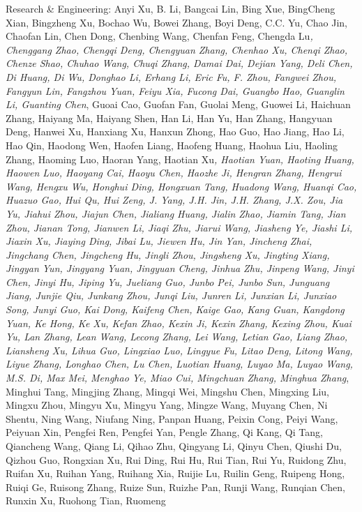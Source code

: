 \documentclass[
  10
]{article}
\begin{document}
Research \& Engineering: Anyi Xu, B. Li, Bangcai Lin, Bing Xue,
BingCheng Xian, Bingzheng Xu, Bochao Wu, Bowei Zhang, Boyi Deng, C.C.
Yu, Chao Jin, Chaofan Lin, Chen Dong, Chenbing Wang, Chenfan Feng,
Chengda Lu\emph{, Chenggang Zhao, Chengqi Deng, Chengyuan Zhang, Chenhao
Xu, Chenqi Zhao, Chenze Shao, Chuhao Wang, Chuqi Zhang, Damai Dai,
Dejian Yang, Deli Chen, Di Huang, Di Wu, Donghao Li, Erhang Li, Eric Fu,
F. Zhou, Fangwei Zhou, Fangyun Lin, Fangzhou Yuan, Feiyu Xia, Fucong
Dai, Guangbo Hao, Guanglin Li, Guanting Chen}, Guoai Cao, Guofan Fan,
Guolai Meng, Guowei Li, Haichuan Zhang, Haiyang Ma, Haiyang Shen, Han
Li, Han Yu, Han Zhang, Hangyuan Deng, Hanwei Xu, Hanxiang Xu, Hanxun
Zhong, Hao Guo, Hao Jiang, Hao Li, Hao Qin, Haodong Wen, Haofen Liang,
Haofeng Huang, Haohua Liu, Haoling Zhang, Haoming Luo, Haoran Yang,
Haotian Xu\emph{, Haotian Yuan, Haoting Huang, Haowen Luo, Haoyang Cai,
Haoyu Chen, Haozhe Ji, Hengran Zhang, Hengrui Wang, Hengxu Wu, Honghui
Ding, Hongxuan Tang, Huadong Wang, Huanqi Cao, Huazuo Gao, Hui Qu, Hui
Zeng, J. Yang, J.H. Jin, J.H. Zhang, J.X. Zou, Jia Yu, Jiahui Zhou,
Jiajun Chen, Jialiang Huang, Jialin Zhao, Jiamin Tang, Jian Zhou, Jianan
Tong, Jianwen Li, Jiaqi Zhu, Jiarui Wang, Jiasheng Ye, Jiashi Li, Jiaxin
Xu, Jiaying Ding, Jibai Lu, Jiewen Hu, Jin Yan, Jincheng Zhai, Jingchang
Chen, Jingcheng Hu, Jingli Zhou, Jingsheng Xu, Jingting Xiang, Jingyan
Yun, Jingyang Yuan, Jingyuan Cheng, Jinhua Zhu, Jinpeng Wang, Jinyi
Chen, Jinyi Hu, Jiping Yu, Jueliang Guo, Junbo Pei, Junbo Sun, Junguang
Jiang, Junjie Qiu, Junkang Zhou, Junqi Liu, Junren Li, Junxian Li,
Junxiao Song, Junyi Guo, Kai Dong, Kaifeng Chen, Kaige Gao, Kang Guan,
Kangdong Yuan, Ke Hong, Ke Xu, Kefan Zhao, Kexin Ji, Kexin Zhang, Kexing
Zhou, Kuai Yu, Lan Zhang, Lean Wang, Lecong Zhang, Lei Wang, Letian Gao,
Liang Zhao, Liansheng Xu, Lihua Guo, Lingxiao Luo, Lingyue Fu, Litao
Deng, Litong Wang, Liyue Zhang, Longhao Chen, Lu Chen, Luotian Huang,
Luyao Ma, Luyao Wang, M.S. Di, Max Mei, Menghao Ye, Miao Cui, Mingchuan
Zhang, Minghua Zhang}, Minghui Tang, Mingjing Zhang, Mingqi Wei, Mingshu
Chen, Mingxing Liu, Mingxu Zhou, Mingyu Xu, Mingyu Yang, Mingze Wang,
Muyang Chen, Ni Shentu, Ning Wang, Niufang Ning, Panpan Huang, Peixin
Cong, Peiyi Wang, Peiyuan Xin, Pengfei Ren, Pengfei Yan, Pengle Zhang,
Qi Kang, Qi Tang, Qiancheng Wang, Qiang Li, Qihao Zhu, Qingyang Li,
Qinyu Chen, Qiushi Du, Qizhou Guo, Rongxian Xu, Rui Ding, Rui Hu, Rui
Tian, Rui Yu, Ruidong Zhu, Ruifan Xu, Ruihan Yang, Ruihang Xia, Ruijie
Lu, Ruilin Geng, Ruipeng Hong, Ruiqi Ge, Ruisong Zhang, Ruize Sun,
Ruizhe Pan, Runji Wang, Runqian Chen, Runxin Xu, Ruohong Tian, Ruomeng
\end{document}
